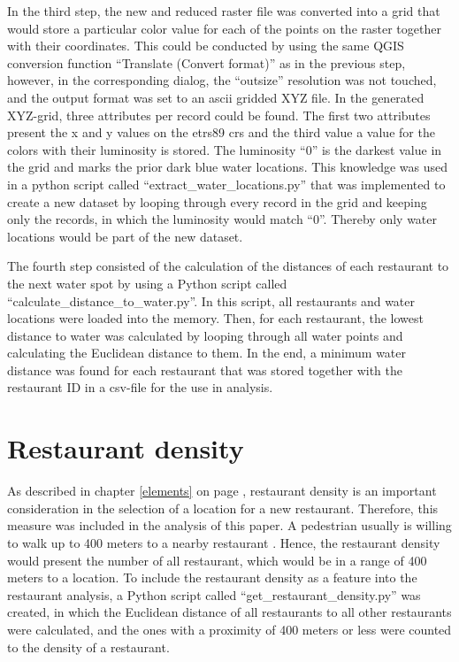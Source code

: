 \documentclass[a4paper, 11pt, oneside]{Thesis}  %
\begin{document}
In the third step, the new and reduced raster file was converted into a grid that would store a particular color value for each of the points on the raster together with their coordinates. This could be conducted by using the same QGIS conversion function ``Translate (Convert format)'' as in the previous step, however, in the corresponding dialog, the ``outsize'' resolution was not touched, and the output format was set to an \ac{ascii} gridded XYZ file. In the generated XYZ-grid, three attributes per record could be found. The first two attributes present the x and y values on the \ac{etrs89} \ac{crs} and the third value a value for the colors with their luminosity is stored. The luminosity ``0'' is the darkest value in the grid and marks the prior dark blue water locations. This knowledge was used in a python script called ``extract\_water\_locations.py'' that was implemented to create a new dataset by looping through every record in the grid and keeping only the records, in which the luminosity would match ``0''. Thereby only water locations would be part of the new dataset.

The fourth step consisted of the calculation of the distances of each restaurant to the next water spot by using a Python script called ``calculate\_distance\_to\_water.py''. In this script, all restaurants and water locations were loaded into the memory. Then, for each restaurant, the lowest distance to water was calculated by looping through all water points and calculating the Euclidean distance to them. In the end, a minimum water distance was found for each restaurant that was stored together with the restaurant ID in a \ac{csv}-file for the use in analysis.

\section{Restaurant density}
\label{restaurant_density}

As described in chapter \ref{elements} on page \pageref{elements}, restaurant density is an important consideration in the selection of a location for a new restaurant. Therefore, this measure was included in the analysis of this paper. A pedestrian usually is willing to walk up to 400 meters to a nearby restaurant \cite{Yang.2012b}. Hence, the restaurant density would present the number of all restaurant, which would be in a range of 400 meters to a location. To include the restaurant density as a feature into the restaurant analysis, a Python script called ``get\_restaurant\_density.py'' was created, in which the Euclidean distance of all  restaurants to all other restaurants were calculated, and the ones with a proximity of 400 meters or less were counted to the density of a restaurant.
\end{document}
